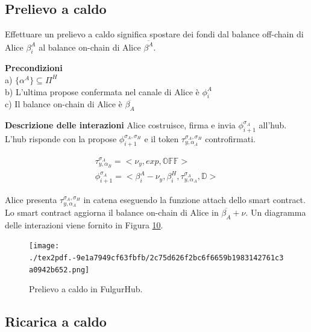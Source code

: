 \documentclass[12pt,italian,]{book}
\begin{document}
\hypertarget{prelievo-a-caldo}{%
\subsection{Prelievo a caldo}\label{prelievo-a-caldo}}

Effettuare un prelievo a caldo significa spostare dei fondi dal balance off-chain di Alice \(\beta^A_i\) al balance on-chain di Alice \(\overline{\beta^A}\).

\textbf{\textbf{Precondizioni}}\\
a) \(\{\alpha^A\} \subseteq \Pi^H\)\\
b) L'ultima propose confermata nel canale di Alice è \(\phi^A_i\)\\
c) Il balance on-chain di Alice è \(\overline{\beta_A}\)

\textbf{\textbf{Descrizione delle interazioni}} Alice costruisce, firma e invia \(\phi^{\sigma_A}_{i+1}\) all'hub. L'hub risponde con la propose \(\phi^{\sigma_A,\sigma_H}_{i+1}\) e il token \(\tau^{\sigma_A,\sigma_H}_{y, \alpha_A}\) controfirmati.

\begin{equation}
\begin{aligned}
\label{Propose detach pagamento OffChain-OffChain}
\tau^{\sigma_A}_{y, \alpha_B} =  <\nu_y, exp, \mathbb{OFF}>\\
\phi^{\sigma_A}_{i+1} = <\beta^A_i-\nu_y, \beta^H_i, \tau^{\sigma_A}_{y, \alpha_A} ,\mathbb{D}>
\end{aligned}
\end{equation}

Alice presenta \(\tau^{\sigma_A,\sigma_H}_{y, \alpha_A}\) in catena eseguendo la funzione attach dello smart contract. Lo smart contract aggiorna il balance on-chain di Alice in \(\overline{\beta_A}+\nu\). Un diagramma delle interazioni viene fornito in Figura \protect\hyperlink{caso-duso-prelievo-a-caldo}{10}.

\begin{figure}
\centering
\texttt{[image: ./tex2pdf.-9e1a7949cf63fbfb/2c75d626f2bc6f6659b1983142761c3a0942b652.png]}
\caption{\protect\hypertarget{caso-duso-prelievo-a-caldo}{}{}Prelievo a caldo in FulgurHub.}
\end{figure}

\hypertarget{ricarica-a-caldo}{%
\subsection{Ricarica a caldo}\label{ricarica-a-caldo}}
\end{document}
